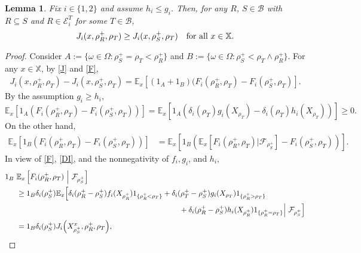 \documentclass[11pt,reqno]{article}
\numberwithin{equation}{section}
\newtheorem{lemma}{Lemma}[section]
\newcommand{\E}{\mathbb{E}}
\newcommand{\cE}{\mathcal{E}}
\newcommand{\X}{\mathbb{X}}
\newcommand{\B}{\mathcal{B}}
\begin{document}
\begin{lemma}\label{l5}
Fix $i\in\{1,2\}$ and assume $h_i\leq g_i$. Then, for any $R$, $S\in\B$ with $R\subseteq S$ and $R\in\cE_i^T$ for some $T\in\B$, 
\[
J_i(x,\rho^+_R,\rho_T)\geq J_i(x,\rho^+_S,\rho_T)\quad  \hbox{for all}\ x\in\X.
\]
\end{lemma}

\begin{proof}
Consider $A:=\{\omega\in\Omega: \rho^+_S=\rho_T<\rho^+_R\}$ and $B:=\{\omega\in\Omega: \rho^+_S<\rho_T\wedge\rho^+_R\}$. For any $x\in\X$, by \eqref{J} and \eqref{F}, 
\begin{align}\label{1_A,B}
J_i(x,\rho^+_R,\rho_T)-J_i(x,\rho^+_S,\rho_T)=\E_x\left[(1_A+1_B)(F_i(\rho^+_R,\rho_T)-F_i(\rho^+_S,\rho_T)\right].%
\end{align}
By the assumption $g_i\ge h_i$, 
\begin{equation}\label{1_A}
\E_x\left[1_A(F_i(\rho^+_R,\rho_T)-F_i(\rho^+_S,\rho_T))\right]=\E_x[1_A(\delta_i(\rho_T)g_i(X_{\rho_T})-\delta_i(\rho_T)h_i(X_{\rho_T}))]\geq 0.
\end{equation}
On the other hand, 
\begin{align}\label{1_B}
\E_x\left[1_B(F_i(\rho^+_R,\rho_T)-F_i(\rho^+_S,\rho_T))\right]&=\E_x\left[1_B\left(\E_x\left[F_i(\rho^+_R,\rho_T)\Big|\mathcal{F}_{\rho^+_S}\right]-F_i(\rho^+_S,\rho_T)\right)\right].%
\end{align}
In view of \eqref{F}, \eqref{DI}, and the nonnegativity of $f_i,g_i$, and $h_i$,
\begin{align}
1_B\ &\E_x\left[F_i(\rho^+_R,\rho_T)\ \middle|\ \mathcal{F}_{\rho^+_S}\right]\notag \\
& \ge1_B \delta_i(\rho^+_S) \E_x\Big[\delta_i(\rho^+_R-\rho^+_S)f_i(X_{\rho^+_R})1_{\{\rho^+_R<\rho_T\}}+\delta_i(\rho^+_T-\rho^+_S)g_i(X_{\rho_T})1_{\{\rho^+_R>\rho_T\}}\notag \\
&\hspace{3in}+\delta_i(\rho^+_R-\rho^+_S)h_i(X_{\rho^+_R})1_{\{\rho^+_R=\rho_T\}} \Big|\ \mathcal{F}_{\rho^+_S}\Big]\notag\\
&= 1_B \delta_i(\rho^+_S) J_i\Big({X^x_{\rho^+_S}}, \rho^+_R, \rho_T\Big),  \label{smaller}

\end{align}
\end{proof}
\end{document}
